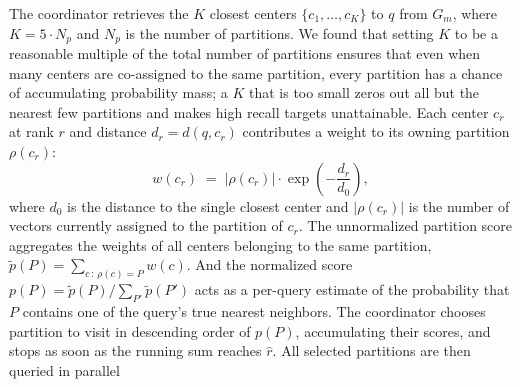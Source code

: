 \documentclass[sigconf,review,anonymous]{acmart}
\begin{document}
    The coordinator retrieves the $K$ closest centers $\{c_1, \ldots, c_K\}$ to $q$ from $G_m$, where $K = 5 \cdot N_p$ and $N_p$ is the number of partitions. We found that setting $K$ to be a reasonable multiple of the total number of partitions ensures that even when many centers are co-assigned to the same partition, every partition has a chance of accumulating probability mass; a $K$ that is too small zeros out all but the nearest few partitions and makes high recall targets unattainable. Each center $c_r$ at rank $r$ and distance $d_r = d(q, c_r)$ contributes a weight to its owning partition $\rho(c_r)$:
    \[
    w(c_r) \;=\; \lvert\rho(c_r)\rvert \cdot \exp\!\left(-\frac{d_r}{d_0}\right),
    \]
    where $d_0$ is the distance to the single closest center and $\lvert\rho(c_r)\rvert$ is the number of vectors currently assigned to the partition of $c_r$. The unnormalized partition score aggregates the weights of all centers belonging to the same partition, $\tilde{p}(P) = \sum_{c \,:\, \rho(c) = P} w(c)$. And the normalized score $p(P) = \tilde{p}(P) / \sum_{P'} \tilde{p}(P')$ acts as a per-query estimate of the probability that $P$ contains one of the query's true nearest neighbors. The coordinator chooses partition to visit in descending order of $p(P)$, accumulating their scores, and stops as soon as the running sum reaches $\hat{r}$. All selected partitions are then queried in parallel
    
    
    
    
\end{document}
